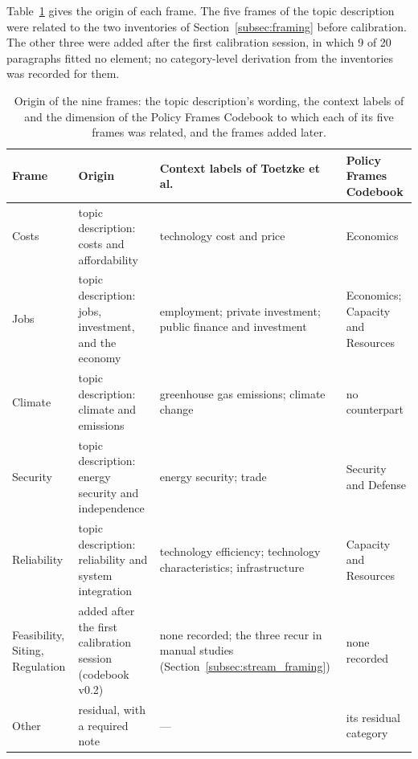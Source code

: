 Table~\ref{tab:frame_crosswalk} gives the origin of each frame. The five frames of the topic description were related to the two inventories of Section~\ref{subsec:framing} before calibration. The other three were added after the first calibration session, in which 9 of 20 paragraphs fitted no element; no category-level derivation from the inventories was recorded for them.

\begin{table}[htbp]
\centering\scriptsize
\setlength{\tabcolsep}{4pt}
\caption[Origin of the nine frames]{Origin of the nine frames: the topic description's wording, the context labels of \textcite{toetzke2022energydiscourse} and the dimension of the Policy Frames Codebook \parencite{boydstun2020policyframes} to which each of its five frames was related, and the frames added later.}\label{tab:frame_crosswalk}
\begin{tabular}{@{}>{\raggedright\arraybackslash}p{18mm}>{\raggedright\arraybackslash}p{38mm}>{\raggedright\arraybackslash}p{52mm}>{\raggedright\arraybackslash}p{38mm}@{}}
\toprule
\textbf{Frame} & \textbf{Origin} & \textbf{Context labels of Toetzke et al.} & \textbf{Policy Frames Codebook} \\
\midrule
Costs & topic description: costs and affordability & technology cost and price & Economics \\
Jobs & topic description: jobs, investment, and the economy & employment; private investment; public finance and investment & Economics; Capacity and Resources \\
Climate & topic description: climate and emissions & greenhouse gas emissions; climate change & no counterpart \\
Security & topic description: energy security and independence & energy security; trade & Security and Defense \\
Reliability & topic description: reliability and system integration & technology efficiency; technology characteristics; infrastructure & Capacity and Resources \\
Feasibility, Siting, Regulation & added after the first calibration session (codebook v0.2) & none recorded; the three recur in manual studies (Section~\ref{subsec:stream_framing}) & none recorded \\
Other & residual, with a required note & --- & its residual category \\
\bottomrule
\end{tabular}
\end{table}

